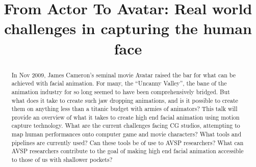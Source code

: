 \documentclass[a4paper]{article}
\title{From Actor To Avatar: Real world challenges in capturing the human face}
\begin{document}
\maketitle

\begin{abstract}
In Nov 2009, James Cameron's seminal movie Avatar raised the bar for what can be achieved with facial animation. For many, the ``Uncanny Valley'', the bane of the animation industry for so long seemed to have been comprehensively bridged. But what does it take to create such jaw dropping animations, and is it possible to create them on anything less than a titanic budget with armies of animators? This talk will provide an overview of what it takes to create high end facial animation using motion capture technology. What are the current challenges facing CG studios, attempting to map human performances onto computer game and movie characters? What tools and pipelines are currently used? Can these tools be of use to AVSP researchers? What can AVSP researchers contribute to the goal of making high end facial animation accessible to those of us with shallower pockets?
\end{abstract}
\end{document}
